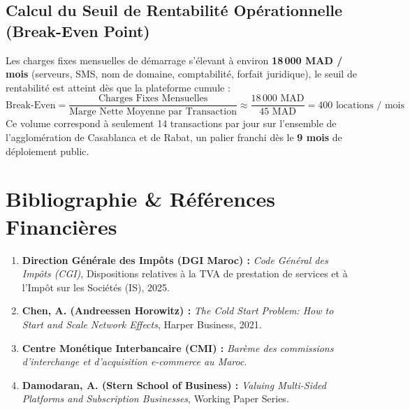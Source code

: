 \documentclass[11pt,a4paper]{report}
\begin{document}
\section{Calcul du Seuil de Rentabilité Opérationnelle (Break-Even Point)}
Les charges fixes mensuelles de démarrage s'élevant à environ \textbf{18\,000 MAD / mois} (serveurs, SMS, nom de domaine, comptabilité, forfait juridique), le seuil de rentabilité est atteint dès que la plateforme cumule :
\begin{equation}
\text{Break-Even} = \frac{\text{Charges Fixes Mensuelles}}{\text{Marge Nette Moyenne par Transaction}} \approx \frac{18\,000\text{ MAD}}{45\text{ MAD}} = 400\text{ locations / mois}
\end{equation}
Ce volume correspond à seulement 14 transactions par jour sur l'ensemble de l'agglomération de Casablanca et de Rabat, un palier franchi dès le \textbf{9\ieme{} mois} de déploiement public.

\chapter*{Bibliographie \& Références Financières}

\begin{enumerate}[leftmargin=*]
    \item \textbf{Direction Générale des Impôts (DGI Maroc) :} \textit{Code Général des Impôts (CGI)}, Dispositions relatives à la TVA de prestation de services et à l'Impôt sur les Sociétés (IS), 2025.
    \item \textbf{Chen, A. (Andreessen Horowitz) :} \textit{The Cold Start Problem: How to Start and Scale Network Effects}, Harper Business, 2021.
    \item \textbf{Centre Monétique Interbancaire (CMI) :} \textit{Barème des commissions d'interchange et d'acquisition e-commerce au Maroc}.
    \item \textbf{Damodaran, A. (Stern School of Business) :} \textit{Valuing Multi-Sided Platforms and Subscription Businesses}, Working Paper Series.
\end{enumerate}
\end{document}
